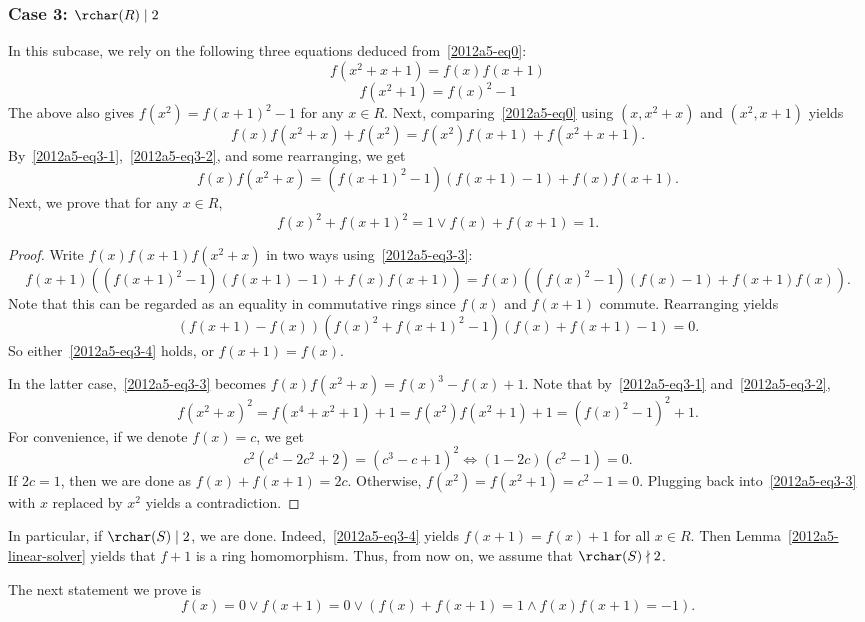 \newpage
\subsubsection*{Case 3: $\rchar(R) \mid 2$}

In this subcase, we rely on the following three equations deduced from~\eqref{2012a5-eq0}:
\[ f(x^2 + x + 1) = f(x) f(x + 1) \tag{3.1}\label{2012a5-eq3-1} \]
\[ f(x^2 + 1) = f(x)^2 - 1 \tag{3.2}\label{2012a5-eq3-2} \]
The above also gives $f(x^2) = f(x + 1)^2 - 1$ for any $x \in R$.
Next, comparing~\eqref{2012a5-eq0} using $(x, x^2 + x)$ and $(x^2, x + 1)$ yields
\[ f(x) f(x^2 + x) + f(x^2) = f(x^2) f(x + 1) + f(x^2 + x + 1). \]
By~\eqref{2012a5-eq3-1},~\eqref{2012a5-eq3-2}, and some rearranging, we get
\[ f(x) f(x^2 + x) = (f(x + 1)^2 - 1)(f(x + 1) - 1) + f(x) f(x + 1). \tag{3.3}\label{2012a5-eq3-3} \]
Next, we prove that for any $x \in R$,
\[ f(x)^2 + f(x + 1)^2 = 1 \vee f(x) + f(x + 1) = 1. \tag{3.4}\label{2012a5-eq3-4} \]

\begin{proof}
Write $f(x) f(x + 1) f(x^2 + x)$ in two ways using~\eqref{2012a5-eq3-3}:
\[ f(x + 1) ((f(x + 1)^2 - 1)(f(x + 1) - 1) + f(x) f(x + 1)) = f(x) ((f(x)^2 - 1)(f(x) - 1) + f(x + 1) f(x)). \]
Note that this can be regarded as an equality in commutative rings since $f(x)$ and $f(x + 1)$ commute.
Rearranging yields
\[ (f(x + 1) - f(x))(f(x)^2 + f(x + 1)^2 - 1)(f(x) + f(x + 1) - 1) = 0. \]
So either~\eqref{2012a5-eq3-4} holds, or $f(x + 1) = f(x)$.

In the latter case,~\eqref{2012a5-eq3-3} becomes $f(x) f(x^2 + x) = f(x)^3 - f(x) + 1$.
Note that by~\eqref{2012a5-eq3-1} and~\eqref{2012a5-eq3-2},
\[ f(x^2 + x)^2 = f(x^4 + x^2 + 1) + 1 = f(x^2) f(x^2 + 1) + 1 = (f(x)^2 - 1)^2 + 1. \]
For convenience, if we denote $f(x) = c$, we get
\[ c^2 (c^4 - 2c^2 + 2) = (c^3 - c + 1)^2 \iff (1 - 2c)(c^2 - 1) = 0. \]
If $2c = 1$, then we are done as $f(x) + f(x + 1) = 2c$.
Otherwise, $f(x^2) = f(x^2 + 1) = c^2 - 1 = 0$.
Plugging back into~\eqref{2012a5-eq3-3} with $x$ replaced by $x^2$ yields a contradiction.
\end{proof}

In particular, if $\rchar(S) \mid 2$, we are done.
Indeed,~\eqref{2012a5-eq3-4} yields $f(x + 1) = f(x) + 1$ for all $x \in R$.
Then Lemma~\ref{2012a5-linear-solver} yields that $f + 1$ is a ring homomorphism.
Thus, from now on, we assume that $\rchar(S) \nmid 2$.

The next statement we prove is
\[ f(x) = 0 \vee f(x + 1) = 0 \vee (f(x) + f(x + 1) = 1 \wedge f(x) f(x + 1) = -1). \tag{3.5}\label{2012a5-eq3-5} \]

